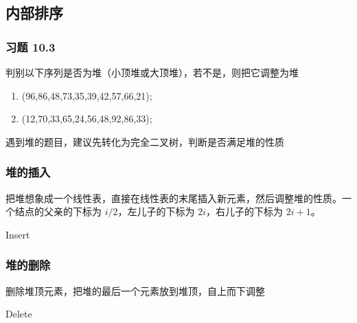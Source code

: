 \documentclass{beamer}
\begin{document}
    \subsection{内部排序}

    \begin{frame}
        \frametitle{习题 10.3}
        判别以下序列是否为堆（小顶堆或大顶堆），若不是，则把它调整为堆
        \begin{enumerate} 
            \item (96,86,48,73,35,39,42,57,66,21);
            \item (12,70,33,65,24,56,48,92,86,33);
        \end{enumerate}
        遇到堆的题目，建议先转化为完全二叉树，判断是否满足堆的性质
    \end{frame}

    \begin{frame}
        \frametitle{堆的插入}
        把堆想象成一个线性表，直接在线性表的末尾插入新元素，然后调整堆的性质。一个结点的父亲的下标为 $i/2$，左儿子的下标为 $2i$，右儿子的下标为 $2i+1$。
        \begin{algorithm}[H]
            \caption{Insert}
        \end{algorithm}
    \end{frame}

    \begin{frame}
        \frametitle{堆的删除}
        删除堆顶元素，把堆的最后一个元素放到堆顶，自上而下调整
        \begin{algorithm}[H]
            \caption{Delete}
        \end{algorithm}
    \end{frame}
\end{document}
